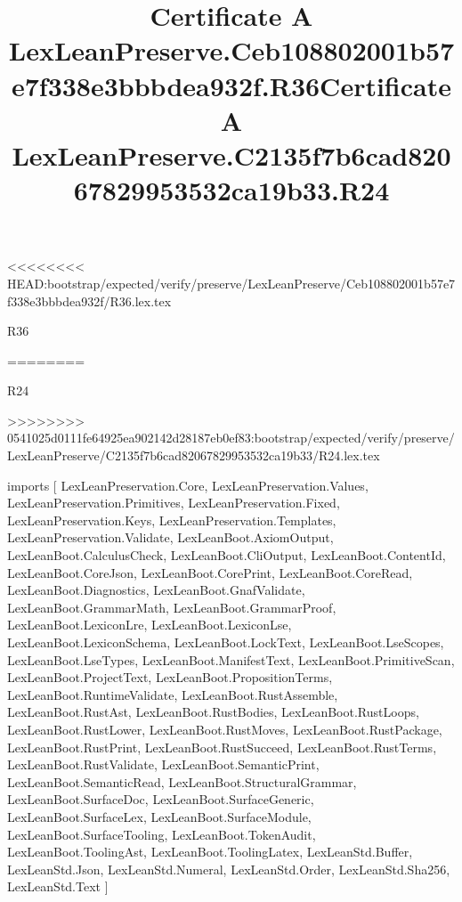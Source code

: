 <<<<<<<< HEAD:bootstrap/expected/verify/preserve/LexLeanPreserve/Ceb108802001b57e7f338e3bbbdea932f/R36.lex.tex
\begin{lexlean}{R36}
\title{Certificate A LexLeanPreserve.Ceb108802001b57e7f338e3bbbdea932f.R36}
========
\begin{lexlean}{R24}
\title{Certificate A LexLeanPreserve.C2135f7b6cad82067829953532ca19b33.R24}
>>>>>>>> 0541025d0111fe64925ea902142d28187eb0ef83:bootstrap/expected/verify/preserve/LexLeanPreserve/C2135f7b6cad82067829953532ca19b33/R24.lex.tex
\begin{coremodule}
imports [
  LexLeanPreservation.Core,
  LexLeanPreservation.Values,
  LexLeanPreservation.Primitives,
  LexLeanPreservation.Fixed,
  LexLeanPreservation.Keys,
  LexLeanPreservation.Templates,
  LexLeanPreservation.Validate,
  LexLeanBoot.AxiomOutput,
  LexLeanBoot.CalculusCheck,
  LexLeanBoot.CliOutput,
  LexLeanBoot.ContentId,
  LexLeanBoot.CoreJson,
  LexLeanBoot.CorePrint,
  LexLeanBoot.CoreRead,
  LexLeanBoot.Diagnostics,
  LexLeanBoot.GnafValidate,
  LexLeanBoot.GrammarMath,
  LexLeanBoot.GrammarProof,
  LexLeanBoot.LexiconLre,
  LexLeanBoot.LexiconLse,
  LexLeanBoot.LexiconSchema,
  LexLeanBoot.LockText,
  LexLeanBoot.LseScopes,
  LexLeanBoot.LseTypes,
  LexLeanBoot.ManifestText,
  LexLeanBoot.PrimitiveScan,
  LexLeanBoot.ProjectText,
  LexLeanBoot.PropositionTerms,
  LexLeanBoot.RuntimeValidate,
  LexLeanBoot.RustAssemble,
  LexLeanBoot.RustAst,
  LexLeanBoot.RustBodies,
  LexLeanBoot.RustLoops,
  LexLeanBoot.RustLower,
  LexLeanBoot.RustMoves,
  LexLeanBoot.RustPackage,
  LexLeanBoot.RustPrint,
  LexLeanBoot.RustSucceed,
  LexLeanBoot.RustTerms,
  LexLeanBoot.RustValidate,
  LexLeanBoot.SemanticPrint,
  LexLeanBoot.SemanticRead,
  LexLeanBoot.StructuralGrammar,
  LexLeanBoot.SurfaceDoc,
  LexLeanBoot.SurfaceGeneric,
  LexLeanBoot.SurfaceLex,
  LexLeanBoot.SurfaceModule,
  LexLeanBoot.SurfaceTooling,
  LexLeanBoot.TokenAudit,
  LexLeanBoot.ToolingAst,
  LexLeanBoot.ToolingLatex,
  LexLeanStd.Buffer,
  LexLeanStd.Json,
  LexLeanStd.Numeral,
  LexLeanStd.Order,
  LexLeanStd.Sha256,
  LexLeanStd.Text
]


\end{coremodule}
\end{lexlean}
\end{lexlean}

